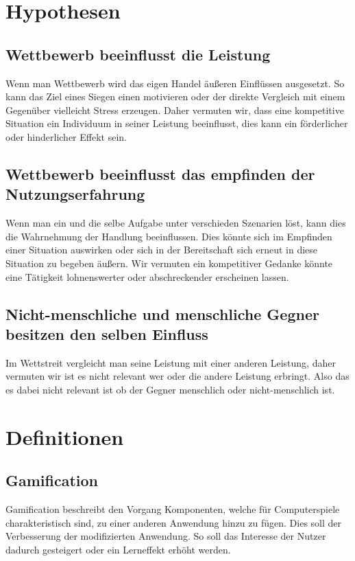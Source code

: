 \section{Hypothesen}
\subsection{Wettbewerb beeinflusst die Leistung}
Wenn man Wettbewerb wird das eigen Handel äußeren Einflüssen ausgesetzt. So kann das Ziel eines Siegen einen motivieren oder der direkte Vergleich mit einem Gegenüber vielleicht Stress erzeugen. Daher vermuten wir, dass eine kompetitive Situation ein Individuum in seiner Leistung beeinflusst, dies kann ein förderlicher oder hinderlicher Effekt sein.
\subsection{Wettbewerb beeinflusst das empfinden der Nutzungserfahrung}
Wenn man ein und die selbe Aufgabe unter verschieden Szenarien löst, kann dies die Wahrnehmung der Handlung beeinflussen. Dies könnte sich im Empfinden einer Situation auswirken oder sich in  der Bereitschaft sich erneut in diese Situation zu begeben äußern. Wir vermuten ein kompetitiver Gedanke könnte eine Tätigkeit lohnenswerter oder abschreckender erscheinen lassen.
\subsection{Nicht-menschliche und menschliche Gegner besitzen den selben Einfluss}
Im Wettstreit vergleicht man seine Leistung mit einer anderen Leistung, daher vermuten wir ist es nicht relevant wer oder die andere Leistung erbringt. Also das es dabei nicht relevant ist ob der Gegner menschlich oder nicht-menschlich ist.

\section{Definitionen}
\subsection{Gamification}
Gamification beschreibt den Vorgang Komponenten, welche für Computerspiele charakteristisch sind, zu einer anderen Anwendung hinzu zu fügen. Dies soll der Verbesserung der modifizierten Anwendung. So soll das Interesse der Nutzer dadurch gesteigert oder ein Lerneffekt erhöht werden.\cite{deterding2011game}
